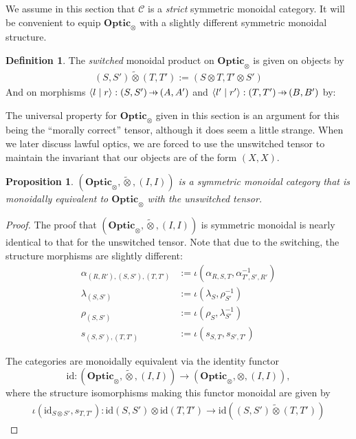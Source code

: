 \documentclass[11pt,letterpaper]{article}
\theoremstyle{plain}
\newtheorem{proposition}[theorem]{Proposition}
\theoremstyle{definition}
\newtheorem{definition}[theorem]{Definition}
\newcommand{\C}{\mathscr{C}}
\newcommand{\Optic}{\mathbf{Optic}}
\newcommand{\switched}{\mathbin{\tilde{\otimes}}}
\newcommand{\id}{\mathrm{id}}
\newcommand{\rep}[2]{{\ensuremath \left\langle #1 \mid #2 \right\rangle}}
\newcommand{\hto}{\ensuremath{\,\mathaccent\shortmid\rightarrow\,}}
\begin{document}
We assume in this section that $\C$ is a \emph{strict} symmetric monoidal category. It will be convenient to equip $\Optic_\otimes$ with a slightly different symmetric monoidal structure.

\begin{definition}
  The \emph{switched} monoidal product on $\Optic_\otimes$ is given on objects by
  \begin{align*}
    (S, S') \switched (T, T') := (S \otimes T, T' \otimes S')
  \end{align*}
  And on morphisms $\rep{l}{r} : (S, S') \hto (A, A')$ and $\rep{l'}{r'} : (T, T') \hto (B, B')$ by:
  \begin{center}
    
  \end{center}
\end{definition}

The universal property for $\Optic_\otimes$ given in this section is an argument for this being the ``morally correct'' tensor, although it does seem a little strange. When we later discuss lawful optics, we are forced to use the unswitched tensor to maintain the invariant that our objects are of the form $(X, X)$.

\begin{proposition}
  $(\Optic_\otimes, \switched, (I, I))$ is a symmetric monoidal category that is monoidally equivalent to $\Optic_\otimes$ with the unswitched tensor.
\end{proposition}
\begin{proof}
  The proof that $(\Optic_\otimes, \switched, (I, I))$ is symmetric monoidal is nearly identical to that for the unswitched tensor. Note that due to the switching, the structure morphisms are slightly different:
  \begin{align*}
    \alpha_{(R, R'), (S, S'), (T, T')} &:= \iota(\alpha_{R,S,T}, \alpha_{T',S',R'}^{-1}) \\
    \lambda_{(S, S')} &:= \iota(\lambda_{S}, \rho_{S'}^{-1}) \\
    \rho_{(S, S')} &:= \iota(\rho_{S}, \lambda_{S'}^{-1}) \\
    s_{(S, S'), (T, T')} &:= \iota(s_{S, T}, s_{S', T'})
  \end{align*}

  The categories are monoidally equivalent via the identity functor \[\id : (\Optic_\otimes, \switched, (I, I)) \to (\Optic_\otimes, \otimes, (I, I)),\] where the structure isomorphisms making this functor monoidal are given by
  \begin{align*}
    \iota(\id_{S \otimes S'}, s_{T, T'}) : \id(S, S') \otimes \id(T, T') \to \id((S, S') \switched (T, T'))
  \end{align*}

\end{proof}
\end{document}
